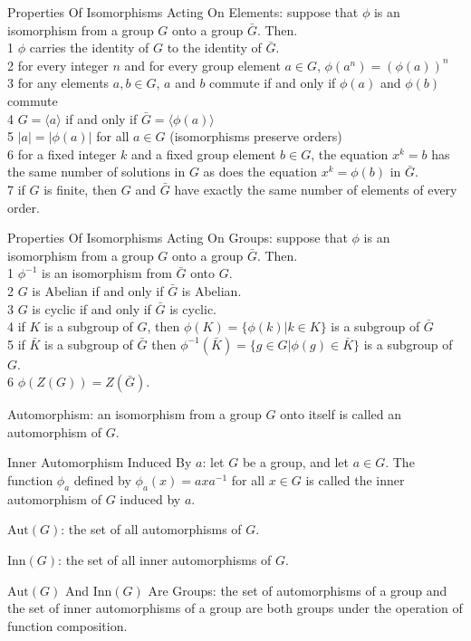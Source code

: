 Properties Of Isomorphisms Acting On Elements: suppose that $\phi$ is an isomorphism from a group $G$ onto a group $\bar{G}$. Then. \\
1 $\phi$ carries the identity of $G$ to the identity of $\bar{G}$. \\
2 for every integer $n$ and for every group element $a \in G$, $\phi (a^n) = (\phi (a))^n$\\
3 for any elements $a,b \in G$, $a$ and $b$ commute if and only if $\phi (a)$ and $\phi (b)$ commute\\
4 $G = \langle a \rangle$ if and only if $\bar{G} = \langle \phi (a) \rangle$\\
5 $|a|=|\phi (a)|$ for all $a \in G$ (isomorphisms preserve orders)\\
6 for a fixed integer $k$ and a fixed group element $b \in G$, the equation $x^k = b$ has the same number of solutions in $G$ as does the equation $x^k = \phi (b)$ in $\bar{G}$. \\
7 if $G$ is finite, then $G$ and $\bar{G}$ have exactly the same number of elements of every order.

Properties Of Isomorphisms Acting On Groups: suppose that $\phi$ is an isomorphism from a group $G$ onto a group $\bar{G}$. Then. \\
1 $\phi^{-1}$ is an isomorphism from $\bar{G}$ onto $G$. \\
2 $G$ is Abelian if and only if $\bar{G}$ is Abelian. \\
3 $G$ is cyclic if and only if $\bar{G}$ is cyclic. \\
4 if $K$ is a subgroup of $G$, then $\phi (K) = \{ \phi (k) | k \in K \}$ is a subgroup of $\bar{G}$\\
5 if $\bar{K}$ is a subgroup of $\bar{G}$ then $\phi^{-1} (\bar{K}) = \{g \in G | \phi (g) \in \bar{K} \}$ is a subgroup of $G$. \\
6 $\phi (Z(G)) = Z(\bar{G})$.

Automorphism: an isomorphism from a group $G$ onto itself is called an automorphism of $G$.

Inner Automorphism Induced By $a$: let $G$ be a group, and let $a \in G$. The function $\phi_a$ defined by $\phi_a (x) = axa^{-1}$ for all $x \in G$ is called the inner automorphism of $G$ induced by $a$.

$\text{Aut}(G)$: the set of all automorphisms of $G$.

$\text{Inn}(G)$: the set of all inner automorphisms of $G$.

$\text{Aut}(G)$ And $\text{Inn}(G)$ Are Groups: the set of automorphisms of a group and the set of inner automorphisms of a group are both groups under the operation of function composition.

